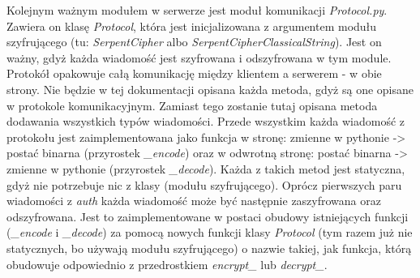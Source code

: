 \documentclass{article}
\begin{document}
	Kolejnym ważnym modułem w serwerze jest moduł komunikacji \textit{Protocol.py}. Zawiera on klasę \textit{Protocol}, która jest inicjalizowana z argumentem modułu szyfrującego (tu: \textit{SerpentCipher} albo \textit{SerpentCipherClassicalString}). Jest on ważny, gdyż każda wiadomość jest szyfrowana i odszyfrowana w tym module. Protokół opakowuje całą komunikację między klientem a serwerem - w obie strony. Nie będzie w tej dokumentacji opisana każda metoda, gdyż są one opisane w protokole komunikacyjnym. Zamiast tego zostanie tutaj opisana metoda dodawania wszystkich typów wiadomości. Przede wszystkim każda wiadomość z protokołu jest zaimplementowana jako funkcja w stronę: zmienne w pythonie -> postać binarna (przyrostek \textit{_encode}) oraz w odwrotną stronę: postać binarna -> zmienne w pythonie (przyrostek \textit{_decode}). Każda z takich metod jest statyczna, gdyż nie potrzebuje nic z klasy (modułu szyfrującego). Oprócz pierwszych paru wiadomości z \textit{auth} każda wiadomość może być następnie zaszyfrowana oraz odszyfrowana. Jest to zaimplementowane w postaci obudowy istniejących funkcji (\textit{_encode} i \textit{_decode}) za pomocą nowych funkcji klasy \textit{Protocol} (tym razem już nie statycznych, bo używają modułu szyfrującego) o nazwie takiej, jak funkcja, którą obudowuje odpowiednio z przedrostkiem \textit{encrypt_} lub \textit{decrypt_}.
\end{document}
